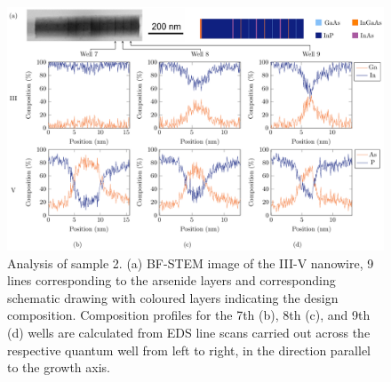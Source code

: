\begin{figure}
    \centering
    \includegraphics[width=\textwidth]{4_Properties/From_Article2/Figure5.pdf}
    \caption{Analysis of sample 2. (a) BF-STEM image of the III-V nanowire, \num{9} lines corresponding to the arsenide layers and corresponding schematic drawing with coloured layers indicating the design composition. Composition profiles for the 7th (b), 8th (c), and 9th (d) wells are calculated from EDS line scans carried out across the respective quantum well from left to right, in the direction parallel to the growth axis.}
    \label{fig:composition}
\end{figure}

